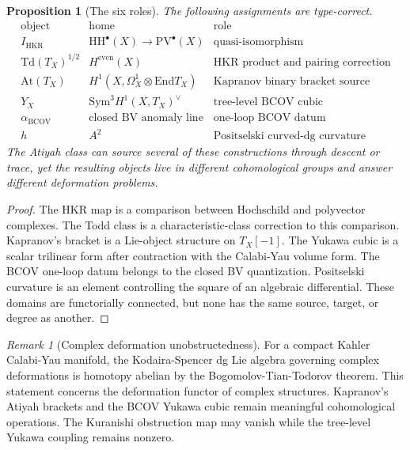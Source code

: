 \documentclass[11pt]{amsart}
\newtheorem{proposition}[theorem]{Proposition}
\theoremstyle{definition}
\theoremstyle{remark}
\newtheorem{remark}[theorem]{Remark}
\providecommand{\At}{\mathrm{At}}
\providecommand{\BCOV}{\mathrm{BCOV}}
\providecommand{\End}{\mathrm{End}}
\providecommand{\HH}{\mathrm{HH}}
\providecommand{\HKR}{\mathrm{HKR}}
\providecommand{\PV}{\mathrm{PV}}
\providecommand{\Sym}{\mathrm{Sym}}
\providecommand{\Td}{\mathrm{Td}}
\begin{document}
\begin{proposition}[The six roles]
\label{prop:six-roles}
The following assignments are type-correct.
\[
\begin{array}{c|c|c}
\text{object} & \text{home} & \text{role}\\
\hline
I_{\HKR} & \HH^\bullet(X)\to\PV^\bullet(X) & \text{quasi-isomorphism}\\
\Td(T_X)^{1/2} & H^{\mathrm{even}}(X) & \text{HKR product and pairing correction}\\
\At(T_X) & H^1(X,\Omega^1_X\otimes\End T_X) & \text{Kapranov binary bracket source}\\
Y_X & \Sym^3H^1(X,T_X)^\vee & \text{tree-level BCOV cubic}\\
\alpha_{\BCOV} & \text{closed BV anomaly line} & \text{one-loop BCOV datum}\\
h & A^2 & \text{Positselski curved-dg curvature}
\end{array}
\]
The Atiyah class can source several of these constructions through
descent or trace, yet the resulting objects live in different
cohomological groups and answer different deformation problems.
\end{proposition}

\begin{proof}
The HKR map is a comparison between Hochschild and polyvector
complexes. The Todd class is a characteristic-class correction to this
comparison. Kapranov's bracket is a Lie-object structure on $T_X[-1]$.
The Yukawa cubic is a scalar trilinear form after contraction with the
Calabi-Yau volume form. The BCOV one-loop datum belongs to the closed
BV quantization. Positselski curvature is an element controlling the
square of an algebraic differential. These domains are functorially
connected, but none has the same source, target, or degree as another.
\end{proof}

\begin{remark}[Complex deformation unobstructedness]
\label{rem:btt}
For a compact Kahler Calabi-Yau manifold, the Kodaira-Spencer dg Lie
algebra governing complex deformations is homotopy abelian by the
Bogomolov-Tian-Todorov theorem. This statement concerns the deformation
functor of complex structures. Kapranov's Atiyah brackets and the BCOV
Yukawa cubic remain meaningful cohomological operations. The Kuranishi
obstruction map may vanish while the tree-level Yukawa coupling remains
nonzero.
\end{remark}
\end{document}
